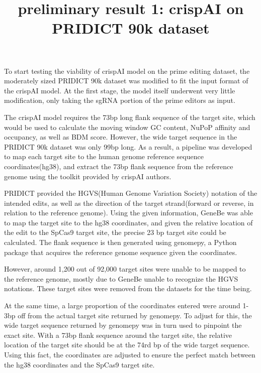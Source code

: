 \documentclass[a4,12pt]{article}
\title{preliminary result 1: crispAI on PRIDICT 90k dataset}
\author{}
\date{}
\begin{document}
\maketitle

To start testing the viability of crispAI model on the prime editing dataset, the moderately sized PRIDICT 90k dataset was modified to fit the input format of the crispAI model. At the first stage, the model itself underwent very little modification, only taking the sgRNA portion of the prime editors as input. 

The crispAI model requires the 73bp long flank sequence of the target site, which would be used to calculate the moving window GC content, NuPoP affinity and occupancy, as well as BDM score\cite{stortzPiCRISPRPhysicallyInformed2023}. However, the wide target sequence in the PRIDICT 90k dataset was only 99bp long. As a result, a pipeline was developed to map each target site to the human genome reference sequence coordinates(hg38), and extract the 73bp flank sequence from the reference genome using the toolkit provided by crispAI authors.

PRIDICT provided the HGVS(Human Genome Variation Society) notation of the intended edits, as well as the direction of the target strand(forward or reverse, in relation to the reference genome). Using the given information, GeneBe was able to map the target site to the hg38 coordinates, and given the relative location of the edit to the SpCas9 target site, the precise 23 bp target site could be calculated\cite{stawinskiGenebenetImplementationValidation2024}. The flank sequence is then generated using genomepy, a Python package that acquires the reference genome sequence given the coordinates.

However, around 1,200 out of 92,000 target sites were unable to be mapped to the reference genome, mostly due to GeneBe unable to recognize the HGVS notations. These target sites were removed from the datasets for the time being. 

At the same time, a large proportion of the coordinates entered were around 1-3bp off from the actual target site returned by genomepy. To adjust for this, the wide target sequence returned by genomepy was in turn used to pinpoint the exact site. With a 73bp flank sequence around the target site, the relative location of the target site should be at the 74rd bp of the wide target sequence. Using this fact, the coordinates are adjusted to ensure the perfect match between the hg38 coordinates and the SpCas9 target site.
\end{document}

